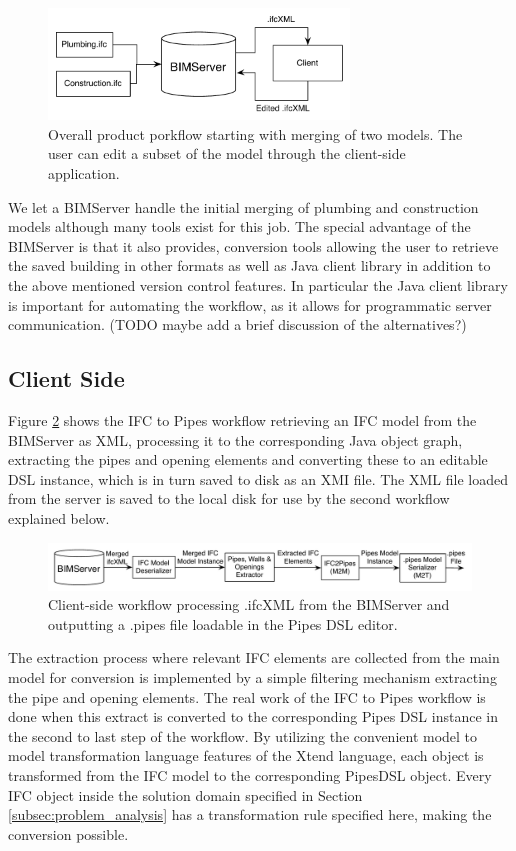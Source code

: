 \begin{figure}[t]
    \centering
        \includegraphics[width=80mm]{images/CompleteWorkflow.pdf}
    \caption{Overall product porkflow starting with merging of two models. The user can edit a subset of the model through the client-side application.}
    \label{fig:overall_product_workflow}
\end{figure}

We let a BIMServer handle the initial merging of plumbing and construction models although many tools exist for this job. The special advantage of the BIMServer is that it also provides, conversion tools allowing the user to retrieve the saved building in other formats as well as Java client library in addition to the above mentioned version control features. In particular the Java client library is important for automating the workflow, as it allows for programmatic server communication. (TODO maybe add a brief discussion of the alternatives?)

\subsection{Client Side}
Figure \ref{fig:IFC2PipesWorkflow} shows the IFC to Pipes workflow retrieving an IFC model from the BIMServer as XML, processing it to the corresponding Java object graph, extracting the pipes and opening elements and converting these to an editable DSL instance, which is in turn saved to disk as an XMI file. The XML file loaded from the server is saved to the local disk for use by the second workflow explained below.

\begin{figure}[t]
    \centering
        \includegraphics[width=120mm]{images/IFC2Pipes.pdf}
    \caption{Client-side workflow processing .ifcXML from the BIMServer and outputting a .pipes file loadable in the Pipes DSL editor.}
    \label{fig:IFC2PipesWorkflow}
\end{figure}

The extraction process where relevant IFC elements are collected from the main model for conversion is implemented by a simple filtering mechanism extracting the pipe and opening elements. The real work of the IFC to Pipes workflow is done when this extract is converted to the corresponding Pipes DSL instance in the second to last step of the workflow. By utilizing the convenient model to model transformation language features of the Xtend language, each object is transformed from the IFC model to the corresponding PipesDSL object. Every IFC object inside the solution domain specified in Section \ref{subsec:problem_analysis} has a transformation rule specified here, making the conversion possible.

